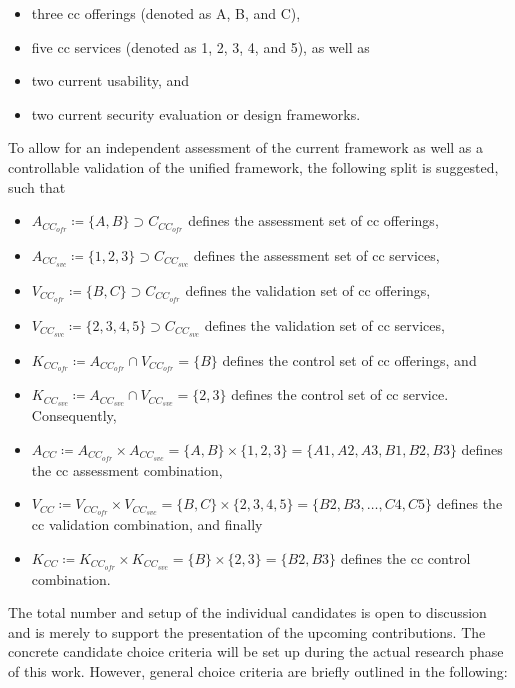 \begin{itemize}
	\item three \ac{cc} offerings (denoted as A, B, and C),
	\item five \ac{cc} services (denoted as 1, 2, 3, 4, and 5), as well as
	\item two current usability, and
	\item two current security evaluation or design frameworks.
\end{itemize}

To allow for an independent assessment of the current framework as well as a  controllable validation of the unified framework, the following split is suggested, such that

\begin{itemize}
	\item $A_{CC_{ofr}} \coloneqq \{A,B\} \supset C_{CC_{ofr}}$ defines the assessment set of \ac{cc} offerings,
	\item $A_{CC_{svc}} \coloneqq \{1,2,3\} \supset C_{CC_{svc}}$ defines the assessment set of \ac{cc} services,
	\item $V_{CC_{ofr}} \coloneqq \{B,C\} \supset C_{CC_{ofr}}$ defines the validation set of \ac{cc} offerings,
	\item $V_{CC_{svc}} \coloneqq \{2,3,4,5\} \supset C_{CC_{svc}}$ defines the validation set of \ac{cc} services,
	\item $K_{CC_{ofr}} \coloneqq A_{CC_{ofr}} \cap V_{CC_{ofr}} = \{B\}$ defines the control set of \ac{cc} offerings, and
	\item $K_{CC_{svc}} \coloneqq A_{CC_{svc}} \cap V_{CC_{svc}} = \{2,3\}$ defines the control set of \ac{cc} service. Consequently,
	\item $A_{CC} \coloneqq A_{CC_{ofr}} \times A_{CC_{svc}} = \{A,B\} \times \{1,2,3\} = \{A1,A2,A3,B1,B2,B3\}$ defines the \ac{cc} assessment combination,
	\item $V_{CC} \coloneqq V_{CC_{ofr}} \times V_{CC_{svc}} = \{B,C\} \times \{2,3,4,5\} = \{B2,B3,\dots,C4,C5\}$ defines the \ac{cc} validation combination, and finally
	\item $K_{CC} \coloneqq K_{CC_{ofr}} \times K_{CC_{svc}} = \{B\} \times \{2,3\} = \{B2,B3\}$ defines the \ac{cc} control combination.
\end{itemize}

The total number and setup of the individual candidates is open to discussion and is merely to support the presentation of the upcoming contributions. The concrete candidate choice criteria will be set up during the actual research phase of this work. However, general choice criteria are briefly outlined in the following: 

